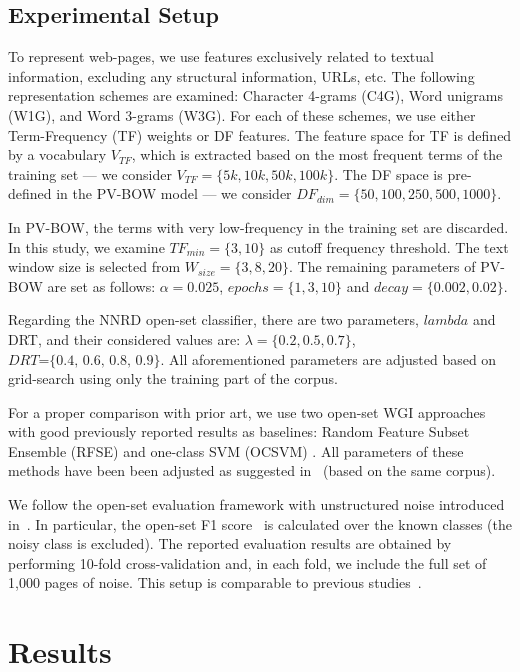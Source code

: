 \subsection{Experimental Setup}\label{sec:evaluation_measures}
To represent web-pages, we use features exclusively related to textual information, excluding any structural information, URLs, etc. The following representation schemes are examined: Character 4-grams (C4G), Word unigrams (W1G), and Word 3-grams (W3G). For each of these schemes, we use either Term-Frequency (TF) weights or DF features. The feature space for TF is defined by a vocabulary $V_{TF}$, which is extracted based on the most frequent terms of the training set --- we consider $V_{TF}=\{5k,10k,50k,100k\}$. The DF space is pre-defined in the PV-BOW model --- we consider $DF_{dim}=\{50,100,250,500,1000\}$.

In PV-BOW, the terms with very low-frequency in the training set are discarded. In this study, we examine $TF_{min}=\{3,10\}$ as cutoff frequency threshold. The text window size is selected from $W_{size}=\{3,8,20\}$. The remaining parameters of PV-BOW are set as follows: $\alpha=0.025$, $epochs=\{1, 3, 10\}$ and $decay=\{0.002, 0.02\}$.

Regarding the NNRD open-set classifier, there are two parameters, $lambda$ and DRT, and their considered values are: $\lambda =\{0.2, 0.5, 0.7\}$, $DRT\textit{=\{0.4, 0.6, 0.8, 0.9\}}$. All aforementioned parameters are adjusted based on grid-search using only the training part of the corpus.

For a proper comparison with prior art, we use two open-set WGI approaches with good previously reported results as baselines: Random Feature Subset Ensemble (RFSE) and one-class SVM (OCSVM) \cite{pritsos2013open,pritsos2018open}. All parameters of these methods have been been adjusted as suggested in~\cite{pritsos2018open} (based on the same corpus).

We follow the open-set evaluation framework with unstructured noise introduced in~\cite{pritsos2018open}. In particular, the open-set F1 score~\cite{mendesjunior2016} is calculated over the known classes (the noisy class is excluded). The reported evaluation results are obtained by performing 10-fold cross-validation and, in each fold, we include the full set of 1,000 pages of noise. This setup is comparable to previous studies~\cite{pritsos2018open}.

\section{Results}\label{sec:Experiments_Results}

